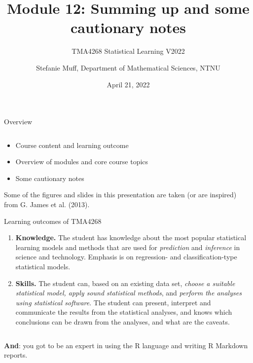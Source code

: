 \documentclass[10pt,ignorenonframetext,]{beamer}
\title{Module 12: Summing up and some cautionary notes}
\subtitle{TMA4268 Statistical Learning V2022}
\author{Stefanie Muff, Department of Mathematical Sciences, NTNU}
\date{April 21, 2022}
\begin{document}
\frame{\titlepage}

\begin{frame}{Overview}
\protect\hypertarget{overview}{}

\(~\)

\begin{itemize}
\item
  Course content and learning outcome \vspace{2mm}
\item
  Overview of modules and core course topics \vspace{2mm}
\item
  Some cautionary notes
\end{itemize}

\end{frame}

\begin{frame}

Some of the figures and slides in this presentation are taken (or are
inspired) from G. James et al. (2013).

\end{frame}

\begin{frame}{Learning outcomes of TMA4268}
\protect\hypertarget{learning-outcomes-of-tma4268}{}

\begin{enumerate}
\item
  \textbf{Knowledge.} The student has knowledge about the most popular
  statistical learning models and methods that are used for
  \emph{prediction} and \emph{inference} in science and technology.
  Emphasis is on regression- and classification-type statistical models.
\item
  \textbf{Skills.} The student can, based on an existing data set,
  \emph{choose a suitable statistical model, apply sound statistical
  methods}, and \emph{perform the analyses using statistical software}.
  The student can present, interpret and communicate the results from
  the statistical analyses, and knows which conclusions can be drawn
  from the analyses, and what are the caveats.
\end{enumerate}

\(~\)

\textbf{And}: you got to be an expert in using the R language and
writing R Markdown reports.

\end{frame}
\end{document}
